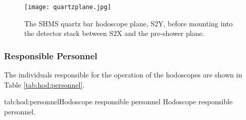 {\begin{figure}
\begin{center}
  \texttt{[image: quartzplane.jpg]}
  \caption{\label{fig:quartzplane}The SHMS quartz bar hodoscope plane, S2Y,
before mounting into the detector stack between S2X and the pre-shower
plane.}
\end{center}
\end{figure}

\subsubsection{Responsible Personnel}

The individuals responsible for the operation
of the hodoscopes are shown in Table \ref{tab:hod:personnel}.

\begin{namestab}{tab:hod:personnel}{Hodoscope responsible personnel}{%
      Hodoscope responsible personnel.}
  \DaveMack{}
  \SimonaMalace{}
\end{namestab}


}%
